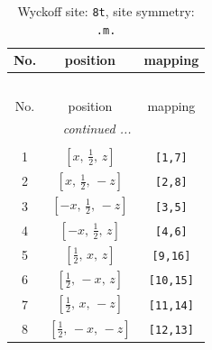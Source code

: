 \documentclass[fleqn,8pt]{jsarticle}
\begin{document}
\renewcommand{\arraystretch}{1.2}
\begin{longtable}{ccc}
\caption{Wyckoff site: {\tt 8t}, site symmetry: {\tt .m.}}
 \\
 \hline \hline
No. & position & mapping \\ \hline \endfirsthead

\multicolumn{2}{l}{\tablename\ \thetable{}} \\
 \hline \hline
No. & position & mapping \\ \hline \endhead

 \hline \hline
\multicolumn{2}{r}{\footnotesize\it continued ...} \\ \endfoot

 \hline \hline
\multicolumn{2}{r}{} \\ \endlastfoot

1 & $\left[ x,\, \frac{1}{2},\, z \right]$ & {\tt [1,7]} \\ \hline
2 & $\left[ x,\, \frac{1}{2},\, - z \right]$ & {\tt [2,8]} \\ \hline
3 & $\left[ - x,\, \frac{1}{2},\, - z \right]$ & {\tt [3,5]} \\ \hline
4 & $\left[ - x,\, \frac{1}{2},\, z \right]$ & {\tt [4,6]} \\ \hline
5 & $\left[ \frac{1}{2},\, x,\, z \right]$ & {\tt [9,16]} \\ \hline
6 & $\left[ \frac{1}{2},\, - x,\, z \right]$ & {\tt [10,15]} \\ \hline
7 & $\left[ \frac{1}{2},\, x,\, - z \right]$ & {\tt [11,14]} \\ \hline
8 & $\left[ \frac{1}{2},\, - x,\, - z \right]$ & {\tt [12,13]} \\
\end{longtable}
\renewcommand{\arraystretch}{1.2}
\end{document}
